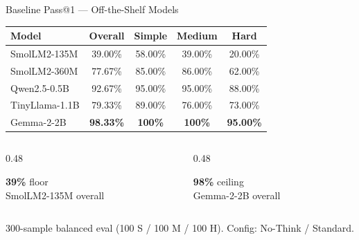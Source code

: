 \documentclass[10pt, aspectratio=169]{beamer}
\begin{document}
\begin{frame}{Baseline Pass@1 — Off-the-Shelf Models}
  \centering
  \footnotesize
  \renewcommand{\arraystretch}{1.55}
  \setlength\tabcolsep{10pt}
  \begin{tabular}{@{}lcccc@{}}
    \toprule
    \textbf{Model} & \textbf{Overall} & \textbf{Simple} & \textbf{Medium} & \textbf{Hard} \\
    \midrule
    SmolLM2-135M   & 39.00\% & 58.00\% & 39.00\% & \textcolor{warn}{20.00\%} \\
    SmolLM2-360M   & 77.67\% & 85.00\% & 86.00\% & 62.00\% \\
    Qwen2.5-0.5B   & 92.67\% & 95.00\% & 95.00\% & 88.00\% \\
    TinyLlama-1.1B & 79.33\% & 89.00\% & 76.00\% & 73.00\% \\
    Gemma-2-2B     & \textbf{98.33\%} & \textbf{100\%} & \textbf{100\%} & \textbf{95.00\%} \\
    \bottomrule
  \end{tabular}

  \vspace{0.6em}
  \begin{columns}[T]
    \begin{column}{0.48\textwidth}
      \begin{tcolorbox}[metricbox]
        {\large\bfseries\color{warn}39\%} {\small floor}\\[-2pt]
        {\scriptsize SmolLM2-135M overall}
      \end{tcolorbox}
    \end{column}
    \begin{column}{0.48\textwidth}
      \begin{tcolorbox}[metricbox]
        {\large\bfseries\color{accent}98\%} {\small ceiling}\\[-2pt]
        {\scriptsize Gemma-2-2B overall}
      \end{tcolorbox}
    \end{column}
  \end{columns}

  \vspace{0.3em}
  {\scriptsize\color{slate} 300-sample balanced eval (100 S / 100 M / 100 H). Config: No-Think / Standard.}
\end{frame}
\end{document}
